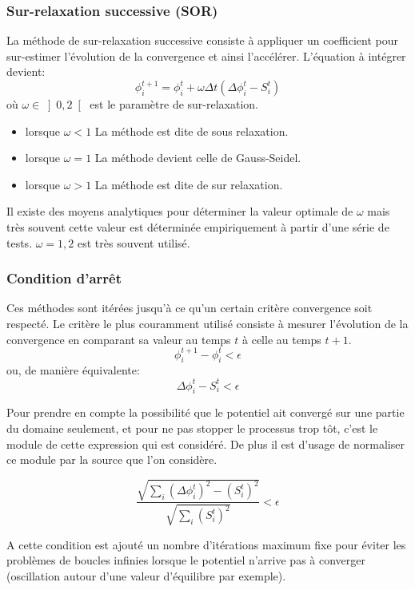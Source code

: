 \subsubsection{Sur-relaxation successive (SOR)}
La méthode de sur-relaxation successive consiste à appliquer un coefficient pour sur-estimer l'évolution de la convergence et ainsi l'accélérer. 
L'équation à intégrer devient:
\[ \phi^{t+1}_i = \phi^{t}_i + \omega  \Delta t \left (\Delta \phi_i^t -S^t_i \right )  \]
où $\omega \in \left] 0,2 \right [$ est le paramètre de sur-relaxation.
\begin{itemize}
\item lorsque $\omega <1$ La méthode est dite de sous relaxation.
\item lorsque $\omega =1$ La méthode devient celle de Gauss-Seidel.
\item lorsque $\omega >1$ La méthode est dite de sur relaxation.
\end{itemize}
Il existe des moyens analytiques pour déterminer la valeur optimale de $\omega$ mais très souvent cette valeur est déterminée empiriquement à partir d'une série de tests. 
$\omega = 1,2$ est très souvent utilisé.

\subsubsection{Condition d'arrêt}
Ces méthodes sont itérées jusqu'à ce qu'un certain critère convergence soit respecté. 
Le critère le plus couramment utilisé consiste à mesurer l'évolution de la convergence en comparant sa valeur au temps $t$ à celle au temps $t+1$.
\[ \phi^{t+1}_i - \phi^{t}_i < \epsilon \]
ou, de manière équivalente:
\[ \Delta \phi_i^t - S_i^t< \epsilon \]

Pour prendre en compte la possibilité que le potentiel ait convergé sur une partie du domaine seulement, et pour ne pas stopper le processus trop tôt, c'est le module de cette expression qui est considéré. 
De plus il est d'usage de normaliser ce module par la source que l'on considère.

\[\dfrac{ \sqrt{  \sum_i \left (  \Delta \phi_i^t \right )^2 - \left (S^t_i  \right )^2 } }{\sqrt{  \sum_i  \left (S^t_i  \right )^2 } } < \epsilon \]

A cette condition est ajouté un nombre d'itérations maximum fixe pour éviter les problèmes de boucles infinies lorsque le potentiel n'arrive pas à converger (oscillation autour d'une valeur d'équilibre par exemple).

